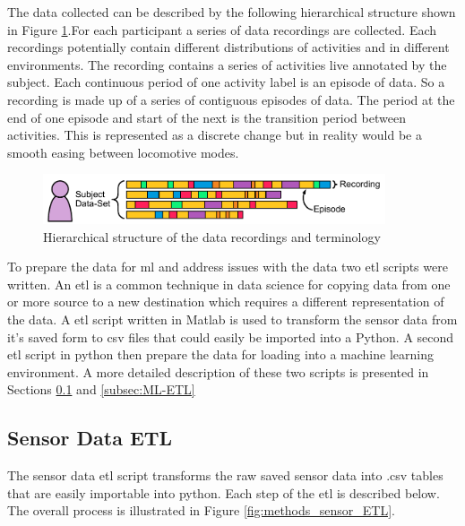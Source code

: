 The data collected can be described by the following hierarchical structure shown in Figure \ref{fig:methods-data-hierachy}.For each participant a series of data recordings are collected. Each recordings potentially contain different distributions of activities and in different environments. The recording contains a series of activities live annotated by the subject. Each continuous period of one activity label is an episode of data. So a recording is made up of a series of contiguous episodes of data. The period at the end of one episode and start of the next is the transition period between activities. This is represented as a discrete change but in reality would be a smooth easing between locomotive modes.

\begin{figure}[!hbt]
    \centering
    \includegraphics[width=0.9\textwidth]{content/3-Methods/Data_Terminology.pdf}
    \caption{Hierarchical structure of the data recordings and terminology}
    \label{fig:methods-data-hierachy}
\end{figure}


    
To prepare the data for \acrshort{ml} and address issues with the data two \acrfull{etl} scripts were written. An \acrshort{etl} is a common technique in data science for copying data from one or more source to a new destination which requires a different representation of the data. A \acrshort{etl} script written in Matlab is used to transform the sensor data from it's saved form to csv files that could easily be imported into a Python. A second \acrshort{etl} script in python then prepare the data for loading into a machine learning environment. A more detailed description of these two scripts is presented in Sections \ref{subsec:sensor-ETL} and \ref{subsec:ML-ETL}

\subsection{Sensor Data ETL}
\label{subsec:sensor-ETL}
The sensor data \acrshort{etl} script transforms the raw saved sensor data into .csv tables that are easily importable into python. Each step of the \acrshort{etl} is described below. The overall process is illustrated in Figure \ref{fig:methods_sensor_ETL}.

